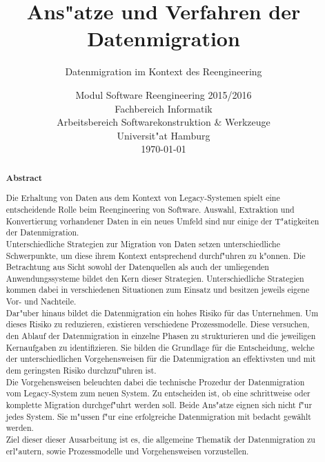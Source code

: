 \documentclass[11pt]{scrartcl}
\begin{document}
	
\title{Ans"atze und Verfahren der Datenmigration}

\subtitle{Datenmigration im Kontext des Reengineering} 


\date{Modul Software Reengineering 2015/2016\\
  \small Fachbereich Informatik\\ 
  Arbeitsbereich Softwarekonstruktion \& Werkzeuge\\ 
  Universit"at Hamburg\\[4mm]
  \today}

\maketitle

\begin{abstract}
	\small\noindent\textbf{Abstract}

	\noindent Die Erhaltung von Daten aus dem Kontext von Legacy-Systemen spielt eine entscheidende Rolle beim Reengineering von Software. Auswahl, Extraktion und Konvertierung vorhandener Daten in ein neues Umfeld sind nur einige der T"atigkeiten der Datenmigration. \\
	Unterschiedliche Strategien zur Migration von Daten setzen unterschiedliche Schwerpunkte, um diese ihrem Kontext entsprechend durchf"uhren zu k"onnen. Die Betrachtung aus Sicht sowohl der Datenquellen als auch der umliegenden Anwendungssysteme bildet den Kern dieser Strategien. Unterschiedliche Strategien kommen dabei in verschiedenen Situationen zum Einsatz und besitzen jeweils eigene Vor- und Nachteile. \\
	Dar"uber hinaus bildet die Datenmigration ein hohes Risiko für das Unternehmen. Um dieses Risiko zu reduzieren, existieren verschiedene Prozessmodelle. Diese versuchen, den Ablauf der Datenmigration in einzelne Phasen zu strukturieren und die jeweiligen Kernaufgaben zu identifizieren. Sie bilden die Grundlage für die Entscheidung, welche der unterschiedlichen Vorgehensweisen für die Datenmigration an effektivsten und mit dem geringsten Risiko durchzuf"uhren ist. \\
	Die Vorgehensweisen beleuchten dabei die technische Prozedur der Datenmigration vom Legacy-System zum neuen System. Zu entscheiden ist, ob eine schrittweise oder komplette Migration durchgef"uhrt werden soll. Beide Ans"atze eignen sich nicht f"ur jedes System. Sie m"ussen f"ur eine erfolgreiche Datenmigration mit bedacht gewählt werden.\\
	Ziel dieser dieser Ausarbeitung ist es, die allgemeine Thematik der Datenmigration zu erl"autern, sowie Prozessmodelle und Vorgehensweisen vorzustellen.
\end{abstract}
\end{document}
